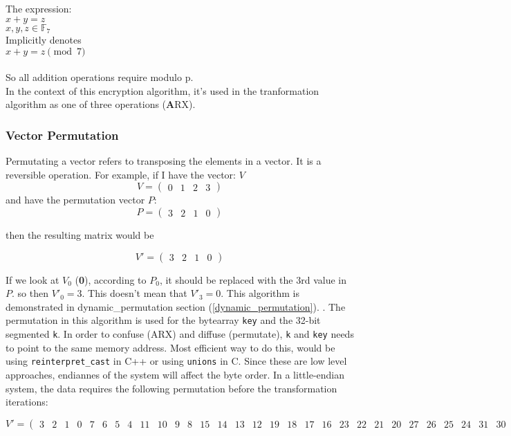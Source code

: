 \documentclass[fleqn, a4paper,12pt]{article}
\begin{document}
The expression:\\
$x + y = z$\\
$x,y,z \in \mathbb{F}_7$\\

Implicitly denotes \\
$x + y = z \pmod 7$\\
\\
So all addition operations require modulo p.\\
In the context of this encryption algorithm, it's used in the tranformation algorithm as one of three operations (\textbf{A}RX). 

\subsubsection{Vector Permutation}

Permutating a vector refers to transposing the elements in a vector. It is a reversible operation.
For example, if I have the vector: $V$ \\
\[
V = 
\begin{pmatrix}
	0 & 1 & 2 & 3
\end{pmatrix}
\]
and have the permutation vector $P$: \\

\[
P = 
\begin{pmatrix}
	3 & 2 & 1 & 0
\end{pmatrix}
\]

then the resulting matrix would be 

\[
V' = 
\begin{pmatrix}
	3 & 2 & 1 & 0
\end{pmatrix}
\]

If we look at $V_0$ (\textbf{0}),  according to $P_0$, it should be replaced with the 3rd value in $P$. so then $V'_0 = 3$. This doesn't mean that $V'_3 = 0$. This algorithm is demonstrated in dynamic\_permutation section (\ref{dynamic_permutation}).
. The permutation in this algorithm is used for the bytearray \texttt{key} and the 32-bit segmented \texttt{k}. In order to confuse (ARX) and diffuse (permutate), \texttt{k} and \texttt{key} needs to point to the same memory address. Most efficient way to do this, would be using \texttt{reinterpret\_cast} in C++ or using \texttt{unions} in C. Since these are low level approaches, endiannes of the system will affect the byte order. In a little-endian system, the data requires the following permutation before the transformation iterations:

\[
V' = 
\begin{pmatrix}
	3 & 2 & 1 & 0 & 7 & 6 & 5 & 4 & 11 & 10 & 9 & 8 & 15 & 14 & 13 & 12 & 19 & 18 & 17 & 16 & 23 & 22 & 21 & 20 & 27 & 26 & 25 & 24 & 31 & 30 & 29 & 28
\end{pmatrix}
\]
\end{document}
